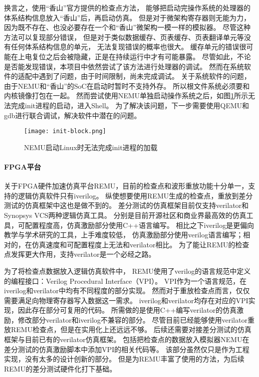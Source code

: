 换言之，使用“香山”官方提供的检查点方法，
能够把启动完操作系统的处理器的体系结构信息放入“香山”后，再启动仿真。
但是对于微架构寄存器则无能为力，
因为既不存在、也没必要存在一个和“香山”微架构一模一样的模拟器。
尽管这种方法可以复现部分错误，
但是对于类似数据缓存、页表缓存、页表翻译单元等没有任何体系结构信息的单元，
无法复现错误的概率也很大。
缓存单元的错误很可能在上电复位之后会被隐藏，正是在持续运行中才有可能暴露。
尽管如此，不论是否能发现错误，本项目中依然尝试了该方法进行处理器的调试。
然而在系统软件的适配中遇到了问题，由于时间限制，尚未完成调试。
关于系统软件的问题，由于NEMU和“香山”的SoC在启动时暂时不支持外存。
所以根文件系统必须要和内核镜像打包在一起。
然而尝试使用NEMU单独启动操作系统之后，如图\ref{fig:init-block}所示无法完成init进程的启动，进入Shell。
为了解决该问题，下一步需要使用QEMU和gdb进行联合调试，解决软件中潜在的问题。

\begin{figure}[htbp]
    \centering
    \texttt{[image: init-block.png]}
    \caption{NEMU启动Linux时无法完成init进程的加载}
    \label{fig:init-block}
\end{figure}

\paragraph{FPGA平台}
关于FPGA硬件加速仿真平台REMU，目前的检查点和波形重放功能十分单一，支持的逻辑仿真软件只有iverilog。
纵使想要使用REMU生成的检查点，重放到差分测试的仿真框架中这也是做不到的。
差分测试的仿真框架目前仅支持verilator和Synopsys VCS两种逻辑仿真工具。
分别是目前开源社区和商业界最高效的仿真工具，可配置程度高，仿真激励部分使用C++语言编写。
相比之下iverilog是更偏向教学与学术研究的工具，上手难度较低，
仿真激励部分使用verilog语言编写；相对的，在仿真速度和可配置程度上无法和verilator相比。
为了能让REMU的检查点发挥更大作用，支持verilator是一个必经之路。

为了将检查点数据放入逻辑仿真软件中，
REMU使用了verilog的语言规范中定义的编程接口：Verilog Procedural Interface（VPI）。
VPI作为一个语言规范，在iverilog和verilator中均有不同程度的部分实现。
然而对于重放检查点而言，仅仅需要满足向物理寄存器写入数据这一需求。
iverilog和verilator均存在对应的VPI实现，因此存在部分可复用的代码。
所需做的是使用C++编写verilator的仿真激励，修改部分verilator和iverilog不兼容的部分。
尽管目前已经能够使用verilator重放REMU检查点，但是在实用化上还远远不够。
后续还需要对接差分测试的仿真框架与目前已有的verilator仿真框架。
包括把检查点的数据放入模拟器NEMU在差分测试的仿真激励脚本中添加VPI的相关代码等。
该部分虽然仅只是作为工程实现，没有太多的设计创新的部分。
但是为REMU丰富了使用的方法，为后续REMU的差分测试硬件化打下基础。

